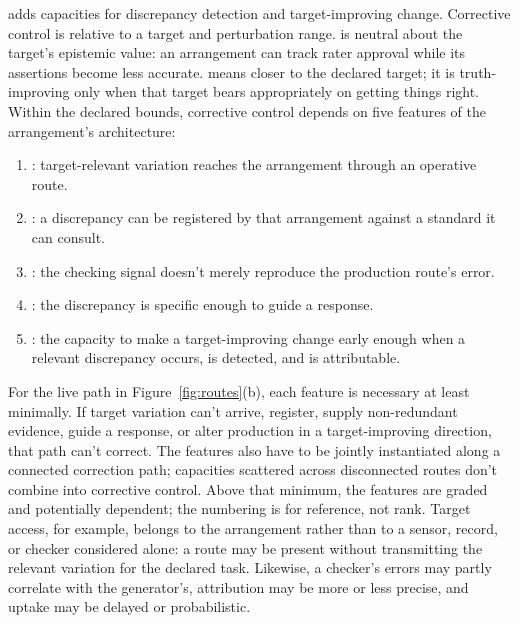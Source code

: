 \documentclass[12pt]{article}
\begin{document}
 adds capacities for discrepancy detection and target-improving
change. Corrective control is relative to a target and perturbation range.
 is neutral about the target's epistemic value: an
arrangement can track rater approval while its assertions become less accurate.
 means closer to the declared target; it is truth-improving only
when that target bears appropriately on getting things right. Within the declared bounds,
corrective control depends on five features of the arrangement's architecture:
\begin{enumerate}[label=\arabic*.,ref=\arabic*]
    \item \label{feat:target-access}: target-relevant variation reaches
    the arrangement through an operative route.
    \item \label{feat:detectability}: a discrepancy can be registered
    by that arrangement against a standard it can consult.
    \item \label{feat:checking-independence}: the checking
    signal doesn't merely reproduce the production route's error.
    \item \label{feat:attribution}: the discrepancy is specific enough to
    guide a response.
    \item \label{feat:effective-uptake}: the capacity to make a
    target-improving change early enough when a relevant discrepancy occurs, is detected,
    and is attributable.
\end{enumerate}

For the live path in Figure~\ref{fig:routes}(b), each feature is necessary at least
minimally. If target variation can't arrive, register, supply non-redundant evidence, guide
a response, or alter production in a target-improving direction, that path can't correct.
The features also have to be jointly instantiated along a connected correction path; capacities
scattered across disconnected routes don't combine into corrective control.
Above that minimum, the features are graded and potentially dependent; the numbering is for
reference, not rank. Target access, for example, belongs to the arrangement rather than to a sensor,
record, or checker considered alone: a route may be present without transmitting the
relevant variation for the declared task. Likewise, a checker's errors may partly correlate
with the generator's, attribution may be more or less precise, and uptake may be delayed or
probabilistic.
\end{document}

